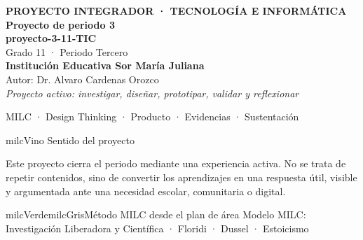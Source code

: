 \documentclass[11pt,letterpaper]{article}
\begin{document}
\thispagestyle{empty}

\vspace*{.85cm}
\begin{tcolorbox}[
  enhanced,colback=milcVino,colframe=milcVino,arc=12mm,width=.86\textwidth,
  boxrule=0pt,left=12mm,right=12mm,top=11mm,bottom=11mm,center,
  overlay={\draw[milcMagenta,line width=2pt,dash pattern=on 9pt off 8pt,rounded corners=10mm]
  ([xshift=7mm,yshift=-7mm]frame.north west) rectangle ([xshift=-7mm,yshift=7mm]frame.south east);}]
  \centering
  {\sffamily\bfseries\color{white}\fontsize{15}{17}\selectfont PROYECTO INTEGRADOR · TECNOLOGÍA E INFORMÁTICA}\\[1.0cm]
  {\sffamily\bfseries\color{white}\fontsize{30}{33}\selectfont Proyecto de periodo 3}\\[3mm]
  {\sffamily\bfseries\color{milcMostaza}\fontsize{25}{28}\selectfont proyecto-3-11-TIC}\\[8mm]
  {\sffamily\color{white}\Large Grado 11 · Periodo Tercero}\\[1.0cm]
  {\sffamily\bfseries\color{white}\large Institución Educativa Sor María Juliana}\\[2mm]
  {\sffamily\color{white}Autor: Dr. Alvaro Cardenas Orozco}\\[4mm]
  {\sffamily\itshape\color{white}Proyecto activo: investigar, diseñar, prototipar, validar y reflexionar}
\end{tcolorbox}
\vfill
\begin{tcolorbox}[enhanced,colback=milcVino!72!black,colframe=milcVino!72!black,arc=5mm,boxrule=0pt,width=.86\textwidth,left=6mm,right=6mm,top=4mm,bottom=4mm,center]
{\color{white}\sffamily\small MILC · Design Thinking · Producto · Evidencias · Sustentación}
\end{tcolorbox}

\newpage
\begin{titlebox}{milcVino}
Sentido del proyecto
\end{titlebox}
\begin{multicols}{2}
Este proyecto cierra el periodo mediante una experiencia activa. No se trata de repetir contenidos, sino de convertir los aprendizajes en una respuesta útil, visible y argumentada ante una necesidad escolar, comunitaria o digital.

\columnbreak
\begin{softbox}{milcVerde}{milcGris}{Método MILC desde el plan de área}
Modelo MILC: Investigación Liberadora y Científica · Floridi · Dussel · Estoicismo
\end{softbox}
\end{multicols}
\end{document}
